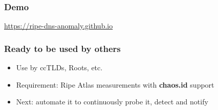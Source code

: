 \documentclass[serif]{beamer}
\begin{document}
\begin{frame}[fragile]
	\frametitle{Demo}
	
	\large
	\url{https://ripe-dns-anomaly.github.io}

\end{frame}


\begin{frame}[fragile]
	\frametitle{Ready to be used by others}
\begin{itemize}
 \item Use by ccTLDs, Roots, etc.
 \item Requirement: Ripe Atlas measurements with \textbf{chaos.id} support
 \item Next: automate it to continuously probe it, detect and notify
\end{itemize}

\end{frame}
\end{document}
